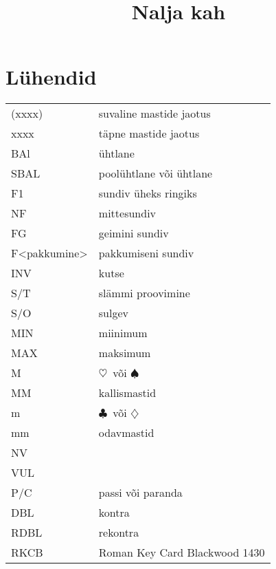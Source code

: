 \documentclass[10pt]{article}
\title{Nalja kah\vspace{-1em}}
\renewcommand{\c}{$\clubsuit$}
\renewcommand{\d}{$\diamondsuit$}
\newcommand{\h}{$\heartsuit$}
\newcommand{\s}{$\spadesuit$}
\begin{document}
\maketitle
\tableofcontents

\section{Lühendid}
\begin{tabular}{l l}
  (xxxx)       & suvaline mastide jaotus       \\
  xxxx         & täpne mastide jaotus          \\
  BAl          & ühtlane                       \\
  SBAL         & poolühtlane või ühtlane       \\
  F1           & sundiv üheks ringiks          \\
  NF           & mittesundiv                   \\
  FG           & geimini sundiv                \\
  F<pakkumine> & pakkumiseni sundiv            \\
  INV          & kutse                         \\
  S/T          & slämmi proovimine             \\
  S/O          & sulgev                        \\
  MIN          & miinimum                      \\
  MAX          & maksimum                      \\
  M            & \h\ või \s\                   \\
  MM           & kallismastid                  \\
  m            & \c\ või \d\                   \\
  mm           & odavmastid                    \\
  NV           &                               \\
  VUL          &                               \\
  P/C          & passi või paranda             \\
  DBL          & kontra                        \\
  RDBL         & rekontra                      \\
  RKCB         & Roman Key Card Blackwood 1430
\end{tabular}
\end{document}
